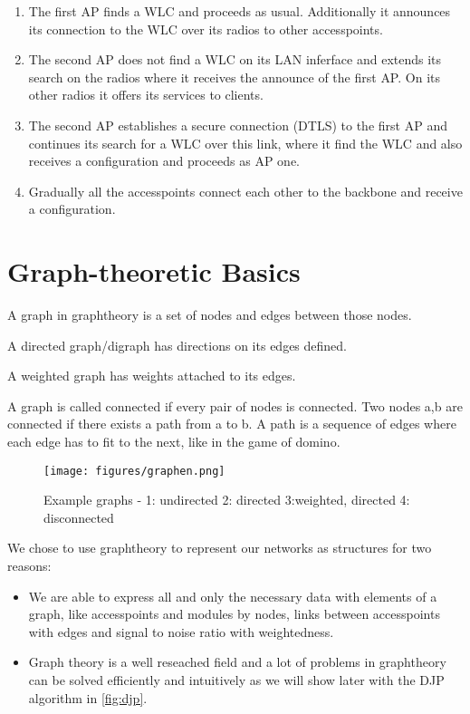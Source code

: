 	\begin{enumerate}
	  \item The first \ac{AP} finds a WLC and proceeds as usual. Additionally it announces its connection to the WLC over its radios to other accesspoints.
	  
	  \item The second \ac{AP} does not find a \ac{WLC} on its LAN inferface and extends its search on the radios where it receives the announce of the first \ac{AP}.
	    On its other radios it offers its services to clients.
	    
	  \item The second \ac{AP} establishes a secure connection (\ac{DTLS}) to the first \ac{AP} and continues its search for a \ac{WLC} over this link, 
	    where it find the \ac{WLC} and also receives a configuration and proceeds as \ac{AP} one.
	    
	  \item Gradually all the accesspoints connect each other to the backbone and receive a configuration.
	\end{enumerate}
	
\section{Graph-theoretic Basics}
  A graph in graphtheory is a set of nodes and edges between those nodes. 
  
  A directed graph/digraph has directions on its edges defined.
  
  A weighted graph has weights attached to its edges.
  
  A graph is called connected if every pair of nodes is connected. 
  Two nodes a,b are connected if there exists a path from a to b.
  A path is a sequence of edges where each edge has to fit to the next, like in the game of domino.
  
  \begin{figure}[th!]
    \centering
    \texttt{[image: figures/graphen.png]}
    \caption{Example graphs - 1: undirected 2: directed 3:weighted, directed 4: disconnected}
    \label{fig:graphen}
  \end{figure}

  We chose to use graphtheory to represent our networks as structures for two reasons:
  
  \begin{itemize}
  
   \item We are able to express all and only the necessary data with elements of a graph, like
    accesspoints and modules by nodes, links between accesspoints with edges and signal to noise ratio with weightedness. 
    
   \item Graph theory is a well reseached field and a lot of problems in graphtheory can be solved efficiently and intuitively 
    as we will show later with the \ac{DJP} algorithm in \ref{fig:djp}.
    
  \end{itemize}
    
